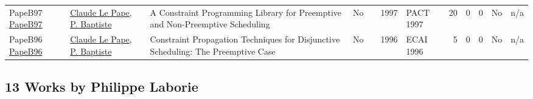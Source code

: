 {\begin{longtable}{>{\raggedright\arraybackslash}p{3cm}>{\raggedright\arraybackslash}p{6cm}>{\raggedright\arraybackslash}p{6.5cm}rrrp{2.5cm}rrrrr}
PapeB97 \href{}{PapeB97} & \hyperref[auth:a164]{Claude Le Pape}, \hyperref[auth:a163]{P. Baptiste} & A Constraint Programming Library for Preemptive and Non-Preemptive Scheduling & No & \cite{PapeB97} & 1997 & PACT 1997 & 20 & 0 & 0 & No & n/a\\
PapeB96 \href{}{PapeB96} & \hyperref[auth:a164]{Claude Le Pape}, \hyperref[auth:a163]{P. Baptiste} & Constraint Propagation Techniques for Disjunctive Scheduling: The Preemptive Case & No & \cite{PapeB96} & 1996 & ECAI 1996 & 5 & 0 & 0 & No & n/a\\
\end{longtable}
}

\clearpage
\subsection{13 Works by Philippe Laborie}
\label{sec:a118}

